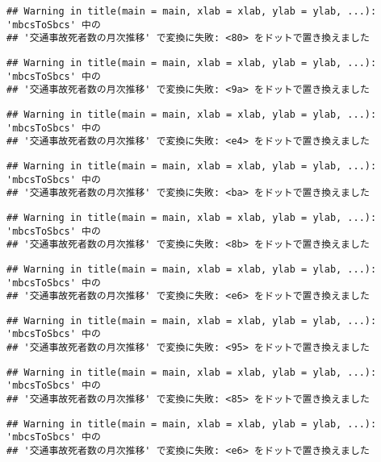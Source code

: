 \documentclass[]{article}
\begin{document}
\begin{verbatim}
## Warning in title(main = main, xlab = xlab, ylab = ylab, ...): 'mbcsToSbcs' 中の
## '交通事故死者数の月次推移' で変換に失敗: <80> をドットで置き換えました
\end{verbatim}

\begin{verbatim}
## Warning in title(main = main, xlab = xlab, ylab = ylab, ...): 'mbcsToSbcs' 中の
## '交通事故死者数の月次推移' で変換に失敗: <9a> をドットで置き換えました
\end{verbatim}

\begin{verbatim}
## Warning in title(main = main, xlab = xlab, ylab = ylab, ...): 'mbcsToSbcs' 中の
## '交通事故死者数の月次推移' で変換に失敗: <e4> をドットで置き換えました
\end{verbatim}

\begin{verbatim}
## Warning in title(main = main, xlab = xlab, ylab = ylab, ...): 'mbcsToSbcs' 中の
## '交通事故死者数の月次推移' で変換に失敗: <ba> をドットで置き換えました
\end{verbatim}

\begin{verbatim}
## Warning in title(main = main, xlab = xlab, ylab = ylab, ...): 'mbcsToSbcs' 中の
## '交通事故死者数の月次推移' で変換に失敗: <8b> をドットで置き換えました
\end{verbatim}

\begin{verbatim}
## Warning in title(main = main, xlab = xlab, ylab = ylab, ...): 'mbcsToSbcs' 中の
## '交通事故死者数の月次推移' で変換に失敗: <e6> をドットで置き換えました
\end{verbatim}

\begin{verbatim}
## Warning in title(main = main, xlab = xlab, ylab = ylab, ...): 'mbcsToSbcs' 中の
## '交通事故死者数の月次推移' で変換に失敗: <95> をドットで置き換えました
\end{verbatim}

\begin{verbatim}
## Warning in title(main = main, xlab = xlab, ylab = ylab, ...): 'mbcsToSbcs' 中の
## '交通事故死者数の月次推移' で変換に失敗: <85> をドットで置き換えました
\end{verbatim}

\begin{verbatim}
## Warning in title(main = main, xlab = xlab, ylab = ylab, ...): 'mbcsToSbcs' 中の
## '交通事故死者数の月次推移' で変換に失敗: <e6> をドットで置き換えました
\end{verbatim}
\end{document}
